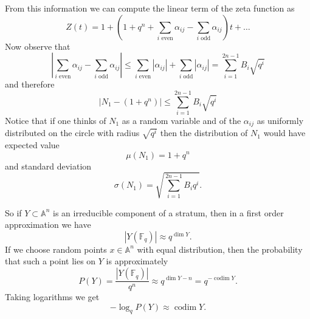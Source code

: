 \documentclass[12pt,a4paper]{amsart}
\theoremstyle{plain}
\theoremstyle{definition}
\newcommand{\FF}{\mathbb F}
\renewcommand{\AA}{\mathbb A}
\DeclareMathOperator{\codim}{codim}
\begin{document}
From this information we can compute the linear term of the zeta function as
\[
	Z(t) = 1 + \left( 1 + q^n+ \sum_{\text{$i$ even}} \alpha_{ij} - \sum_{\text{$i$ odd}} \alpha_{ij} \right) t + \dots
\]
Now observe that
\[
	\left| \sum_{\text{$i$ even}} \alpha_{ij} - \sum_{\text{$i$ odd}} \alpha_{ij} \right| 
	\le \sum_{\text{$i$ even}} |\alpha_{ij}| + \sum_{\text{$i$ odd}} |\alpha_{ij}|  
	= \sum_{i=1}^{2n-1} B_i \sqrt{q^i}
\]
and therefore
\[
	| N_1 - (1+q^n) | \le \sum_{i=1}^{2n-1} B_i \sqrt{q^i}
\]
Notice that if one thinks of $N_1$ as a random variable and of the $\alpha_{ij}$ as uniformly distributed on the circle with radius $\sqrt{q^i}$ then the distribution of $N_1$ would have expected value
\[
	\mu(N_1) = 1+ q^n
\]
and standard deviation
\[
	\sigma(N_1) = \sqrt{\sum_{i=1}^{2n-1} B_i q^i}.
\]


So if $Y \subset \AA^n$ is an irreducible component of a stratum, then in a first order approximation we have
\[
	|Y(\FF_q) | \approx q^{\dim Y}.
\]
If we choose random points $x \in \AA^n$ with equal distribution, then the probability that such a point lies on $Y$ is approximately
\[
	P(Y) = \frac{|Y(\FF_q)|}{q^n} \approx q^{\dim Y - n} = q^{-\codim Y}.
\]
Taking logarithms we get
\[
	- \log_q P(Y) \approx \codim Y.
\]

\end{document}
